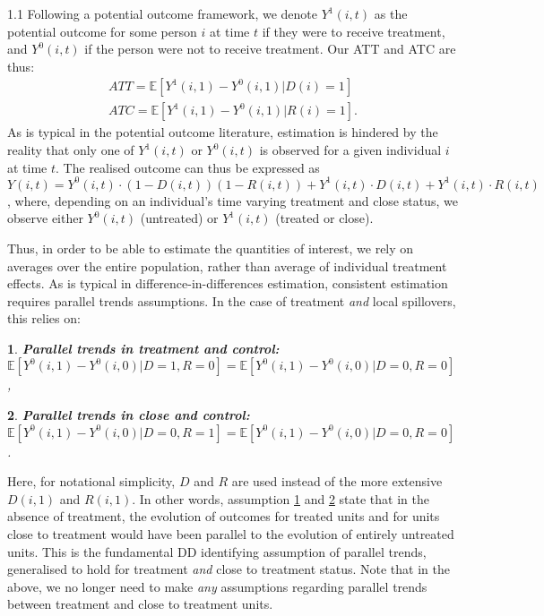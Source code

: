 \documentclass{article}
\makeatletter
\newtheorem*{assumption*}{\assumptionnumber}
\providecommand{\assumptionnumber}{}
\newenvironment{assumption}[2]
 {%
  \renewcommand{\assumptionnumber}{Assumption #1{#2}}%
  \begin{assumption*}%
  \protected@edef\@currentlabel{#1}%
 }
 {%
  \end{assumption*}
 }
\makeatother
\begin{document}
\begin{spacing}{1.1}
Following a potential outcome framework, we denote $Y^1(i,t)$ as the potential
outcome for some person $i$ at time $t$ if they were to receive treatment, and
$Y^0(i,t)$ if the person were not to receive treatment.  Our ATT and ATC are
thus:
\begin{eqnarray}
\label{Seqn:estim}
ATT=\mathbb{E}[Y^1(i,1)-Y^0(i,1)|D(i)=1]\  \\
ATC=\mathbb{E}[Y^1(i,1)-Y^0(i,1)|R(i)=1].
\end{eqnarray}
As is typical in the potential outcome literature, estimation is hindered by the
reality that only one of $Y^1(i,t)$ or $Y^0(i,t)$ is observed for a given 
individual $i$ at time $t$.  The realised outcome can thus be expressed as 
$Y(i,t)=Y^0(i,t)\cdot (1-D(i,t))(1-R(i,t))+Y^1(i,t)\cdot D(i,t)+Y^1(i,t)\cdot 
R(i,t)$, where, depending on an individual's time varying treatment and close
status, we observe either $Y^0(i,t)$ (untreated) or $Y^1(i,t)$ (treated or 
close).

Thus, in order to be able to estimate the quantities of interest, we rely on
averages over the entire population, rather than average of individual 
treatment effects.  As is typical in difference-in-differences estimation,
consistent estimation requires parallel trends assumptions.  In the case of
treatment \emph{and} local spillovers, this relies on:

\begin{assumption}{1}{}
\label{Sass:PT}
\textbf{Parallel trends in treatment and control:} \\
$\mathbb{E}[Y^0(i,1)-Y^0(i,0)|D=1,R=0]=\mathbb{E}[Y^0(i,1)-Y^0(i,0)|D=0,R=0]$,
\end{assumption}
\begin{assumption}{2}{}
\label{Sass:PTC}
\textbf{Parallel trends in close and control:} \\
$\mathbb{E}[Y^0(i,1)-Y^0(i,0)|D=0,R=1]=\mathbb{E}[Y^0(i,1)-Y^0(i,0)|D=0,R=0]$.
\end{assumption}

Here, for notational simplicity, $D$ and $R$ are used instead of the more 
extensive $D(i,1)$ and $R(i,1)$.  In other words, assumption \ref{Sass:PT}
and \ref{Sass:PTC} state that in the absence of treatment, the evolution
of outcomes for treated units and for units close to treatment would have
been parallel to the evolution of entirely untreated units.  This is the
fundamental DD identifying assumption of parallel trends, generalised to
hold for treatment \emph{and} close to treatment status.  Note that in
the above, we no longer need to make \emph{any} assumptions regarding
parallel trends between treatment and close to treatment units.


\end{spacing}
\end{document}

